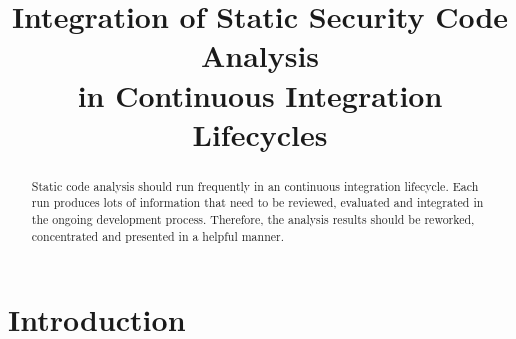 \documentclass[conference]{IEEEtran}
\begin{document}
%
\title{Integration of Static Security Code Analysis\\in Continuous Integration Lifecycles}






\author{
	}








\maketitle


\begin{abstract}
\boldmath
Static code analysis should run frequently in an continuous integration lifecycle. Each run produces lots of information that need to be reviewed, evaluated and integrated in the ongoing development process. Therefore, the analysis results should be reworked, concentrated and presented in a helpful manner.
\end{abstract}


\IEEEpeerreviewmaketitle



\section{Introduction}
{}
\cite{SecurityinCI}
\end{document}
